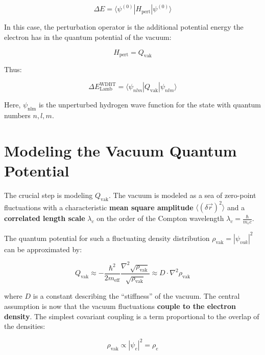 \begin{equation}
    \Delta E = \langle \psi^{(0)} | H_{\text{pert}} | \psi^{(0)} \rangle
\end{equation}

In this case, the perturbation operator is the additional potential energy the electron has in the quantum potential of the vacuum:

\begin{equation}
    H_{\text{pert}} = Q_{\text{vak}}
\end{equation}

Thus:

\begin{equation}
    \Delta E_{\text{Lamb}}^{\text{WDBT}} = \langle \psi_{nlm} | Q_{\text{vak}} | \psi_{nlm} \rangle
\end{equation}

Here, $\psi_\text{nlm}$ is the unperturbed hydrogen wave function for the state with quantum numbers $n,l,m$.

\section{Modeling the Vacuum Quantum Potential}
The crucial step is modeling $Q_\text{vak}$. The vacuum is modeled as a sea of zero-point fluctuations with a characteristic \textbf{mean square amplitude} $\langle (\delta \vec{r})^2 \rangle$ and a \textbf{correlated length scale} $\lambda_c$ on the order of the Compton wavelength $\lambda_c = \frac{\hbar}{m_e c}$.

The quantum potential for such a fluctuating density distribution $\rho_\text{vak}= \left|\psi_{vak}\right|^2$ can be approximated by:

\begin{equation}
    Q_{\text{vak}} \approx -\frac{\hbar^2}{2m_{\text{eff}}} \frac{\nabla^2 \sqrt{\rho_{\text{vak}}}}{\sqrt{\rho_{\text{vak}}}} \approx D \cdot \nabla^2 \rho_{\text{vak}}
\end{equation}

where $D$ is a constant describing the \enquote{stiffness} of the vacuum. The central assumption is now that the vacuum fluctuations \textbf{couple to the electron density}. The simplest covariant coupling is a term proportional to the overlap of the densities:

\begin{equation}
    \rho_\text{vak} \propto \left| \psi_e \right|^2 = \rho_e
\end{equation}

